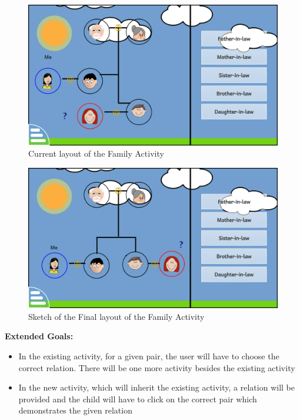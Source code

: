 \documentclass[preprint,12pt]{elsarticle}
\begin{document}
\begin{figure}[H]
\centering\includegraphics[width=1.0\linewidth]{family}
\caption{Current layout of the Family Activity}
\end{figure}

\begin{figure}[H]
\centering\includegraphics[width=1.0\linewidth]{family_test_2}
\caption{Sketch of the Final layout of the Family Activity}
\end{figure}

\textbf{Extended Goals:}

\begin{itemize}
\item In the existing activity, for a given pair, the user will have to choose the correct relation. There will be one more activity besides the existing activity
\item In the new activity, which will inherit the existing activity, a relation will be provided and the child will have to click on the correct pair which demonstrates the given relation
\end{itemize}
\end{document}
